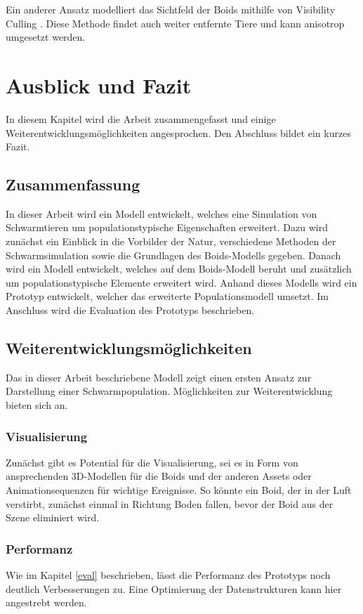 \documentclass[draft=false
              ,paper=a4
              ,twoside=false
              ,fontsize=11pt
              ,headsepline
              ,BCOR10mm
              ,DIV11
              ,bibtotoc
              ,liststotoc
              ]{scrbook}
\begin{document}
Ein anderer Ansatz modelliert das Sichtfeld der Boids mithilfe von Visibility Culling \cite{journals/cie/SilvaLC09}. Diese Methode findet auch weiter entfernte Tiere und kann anisotrop umgesetzt werden.

\chapter{Ausblick und Fazit}\label{fazit}
In diesem Kapitel wird die Arbeit zusammengefasst und einige Weiterentwicklungsmöglichkeiten angesprochen. Den Abschluss bildet ein kurzes Fazit.
\section{Zusammenfassung}
In dieser Arbeit wird ein Modell entwickelt, welches eine Simulation von Schwarmtieren um populationstypische Eigenschaften erweitert. Dazu wird zunächst ein Einblick in die Vorbilder der Natur, verschiedene Methoden der Schwarmsimulation sowie die Grundlagen des Boids-Modells gegeben. Danach wird ein Modell entwickelt, welches auf dem Boids-Modell beruht und zusätzlich um populationstypische Elemente erweitert wird. Anhand dieses Modells wird ein Prototyp entwickelt, welcher das erweiterte Populationsmodell umsetzt. Im Anschluss wird die Evaluation des Prototyps beschrieben.
\section{Weiterentwicklungsmöglichkeiten}
Das in dieser Arbeit beschriebene Modell zeigt einen ersten Ansatz zur Darstellung einer Schwarmpopulation. Möglichkeiten zur Weiterentwicklung bieten sich an.
\subsection{Visualisierung}
Zunächst gibt es Potential für die Visualisierung, sei es in Form von ansprechenden 3D-Modellen für die Boids und der anderen Assets oder Animationsequenzen für wichtige Ereignisse. So könnte ein Boid, der in der Luft verstirbt, zunächst einmal in Richtung Boden fallen, bevor der Boid aus der Szene eliminiert wird.

\subsection{Performanz}
Wie im Kapitel \ref{eval} beschrieben, lässt die Performanz des Prototyps noch deutlich Verbesserungen zu. Eine Optimierung der Datenstrukturen kann hier angestrebt werden.
\end{document}
